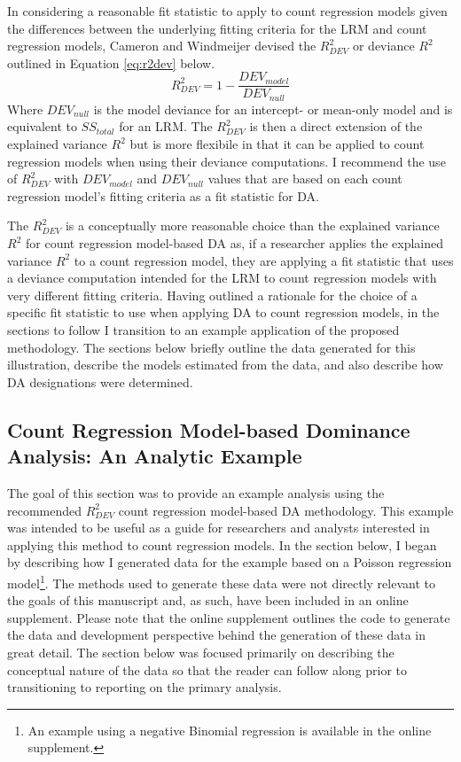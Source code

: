 \documentclass[man]{apa7}
\begin{document}
	In considering a reasonable fit statistic to apply to count regression models given the differences between the underlying fitting criteria for the LRM and count regression models, Cameron and Windmeijer \parencite*{cameron1996r} devised the $R^2_{DEV}$ or deviance $R^2$ outlined in Equation \ref{eq:r2dev} below.
	\begin{equation}
		R^{2}_{DEV} = 1 - \frac{DEV_{model}}{DEV_{null}}
		\label{eq:r2dev}
	\end{equation}
	Where $DEV_{null}$ is the model deviance for an intercept- or mean-only model and is equivalent to $SS_{total}$ for an LRM.
	The $R^2_{DEV}$ is then a direct extension of the explained variance $R^2$ but is more flexibile in that it can be applied to count regression models when using their deviance computations.
	I recommend the use of $R^2_{DEV}$ with $DEV_{model}$ and $DEV_{null}$ values that are based on each count regression model's fitting criteria as a fit statistic for DA.
	
	The $R^2_{DEV}$ is a conceptually more reasonable choice than the explained variance $R^2$ for count regression model-based DA as, if a researcher applies the explained variance $R^2$ to a count regression model, they are applying a fit statistic that uses a deviance computation intended for the LRM to count regression models with very different fitting criteria. 
	Having outlined a rationale for the choice of a specific fit statistic to use when applying DA to count regression models, in the sections to follow I transition to an example application of the proposed methodology.
	The sections below briefly outline the data generated for this illustration, describe the models estimated from the data, and also describe how DA designations were determined.
	
	\subsection{Count Regression Model-based Dominance Analysis: An Analytic Example}
	
	The goal of this section was to provide an example analysis using the recommended $R^2_{DEV}$ count regression model-based DA methodology.
	This example was intended to be useful as a guide for researchers and analysts interested in applying this method to count regression models.
	In the section below, I began by describing how I generated data for the example based on a Poisson regression model\footnote{
		An example using a negative Binomial regression is available in the online supplement.}.
	The methods used to generate these data were not directly relevant to the goals of this manuscript and, as such, have been included in an online supplement.
	Please note that the online supplement outlines the code to generate the data and development perspective behind the generation of these data in great detail.
	The section below was focused primarily on describing the conceptual nature of the data so that the reader can follow along prior to transitioning to reporting on the primary analysis.
\end{document}
